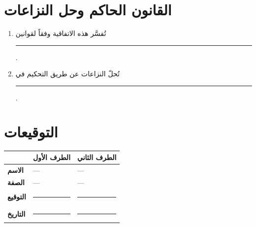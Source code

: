 \documentclass[12pt,a4paper]{article}
\begin{document}
\section{القانون الحاكم وحل النزاعات}
\label{sec:law}
\begin{enumerate}
    \item تُفسَّر هذه الاتفاقية وفقاً لقوانين \rule{6cm}{0.4pt}.
    \item تُحلّ النزاعات عن طريق التحكيم في \rule{4cm}{0.4pt}.
\end{enumerate}

\vspace{2em}
\section*{التوقيعات}

\begin{table}[H]
\centering
\renewcommand{\arraystretch}{2.5}
\begin{tabularx}{\textwidth}{L{6cm} X X}
\toprule
& \textbf{الطرف الأول} & \textbf{الطرف الثاني} \\
\midrule
\textbf{الاسم} & --- & --- \\
\textbf{الصفة} & --- & --- \\
\textbf{التوقيع} & \rule{4cm}{0.4pt} & \rule{4cm}{0.4pt} \\
\textbf{التاريخ} & \rule{4cm}{0.4pt} & \rule{4cm}{0.4pt} \\
\bottomrule
\end{tabularx}
\end{table}
\end{document}
